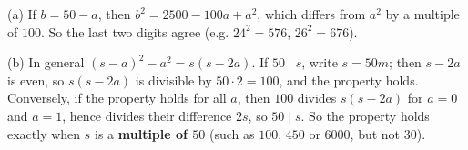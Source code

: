 (a) If $b=50-a$, then $b^2=2500-100a+a^2$, which differs from $a^2$ by a multiple of $100$. So the last two digits agree (e.g. $24^2=576$, $26^2=676$).

(b) In general $(s-a)^2-a^2=s(s-2a)$. If $50\mid s$, write $s=50m$; then $s-2a$ is even, so $s(s-2a)$ is divisible by $50\cdot2=100$, and the property holds. Conversely, if the property holds for all $a$, then $100$ divides $s(s-2a)$ for $a=0$ and $a=1$, hence divides their difference $2s$, so $50\mid s$. So the property holds exactly when $s$ is a \textbf{multiple of $50$} (such as $100$, $450$ or $6000$, but not $30$).
